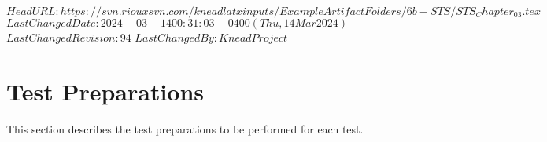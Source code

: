 \svnidlong
{$HeadURL: https://svn.riouxsvn.com/kneadlatxinputs/ExampleArtifactFolders/6b-STS/STS_Chapter_03.tex $}
{$LastChangedDate: 2024-03-14 00:31:03 -0400 (Thu, 14 Mar 2024) $}
{$LastChangedRevision: 94 $}
{$LastChangedBy: KneadProject $}


\chapter{Test Preparations}
\label{loc:TestPreparations}
% 

This section describes the test preparations to be performed for each test.


\newcommand{\StsTestID}{WiFi Packet Test}%



